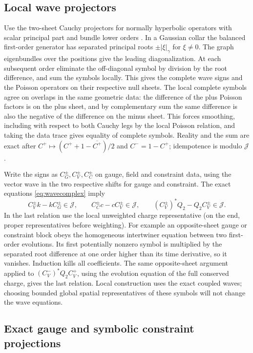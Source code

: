 \documentclass[11pt]{article}
\newcommand{\Reg}{\mathcal J}
\begin{document}
\subsection{Local wave projectors}

Use the two-sheet Cauchy projectors for normally hyperbolic operators with scalar principal part and bundle lower orders \cite[\S\S5--6]{GOW}. In a Gaussian collar the balanced first-order generator has separated principal roots \(\pm|\xi|_\gamma\) for \(\xi\ne0\). The graph eigenbundles over the positions give the leading diagonalization. At each subsequent order eliminate the off-diagonal symbol by division by the root difference, and sum the symbols locally. This gives the complete wave signs and the Poisson operators on their respective null sheets. The local complete symbols agree on overlaps in the same geometric data: the difference of the plus Poisson factors is on the plus sheet, and by complementary sum the same difference is also the negative of the difference on the minus sheet. This forces smoothing, including with respect to both Cauchy legs by the local Poisson relation, and taking the data trace gives equality of complete symbols. Reality and the sum are exact after \(C^+\mapsto(C^++1-\overline{C^+})/2\) and \(C^-=1-C^+\); idempotence is modulo \(\Reg\).

Write the signs as \(C_G^\pm,C_V^\pm,C_C^\pm\) on gauge, field and constraint data, using the vector wave in the two respective shifts for gauge and constraint. The exact equations \eqref{eq:wavecomplex} imply
\begin{equation}
 C_V^\pm k-k C_G^\pm\in\Reg,\qquad
 C_C^\pm c-c C_V^\pm\in\Reg,\qquad
 (C_V^\pm)^*Q_2-Q_2C_V^\pm\in\Reg .
 \label{eq:signs}
\end{equation}
In the last relation use the local unweighted charge representative (on the end, proper representatives before weighting). For example an opposite-sheet gauge or constraint block obeys the homogeneous intertwiner equation between two first-order evolutions. Its first potentially nonzero symbol is multiplied by the separated root difference at one order higher than its time derivative, so it vanishes. Induction kills all coefficients. The same opposite-sheet argument applied to \((C^-_V)^*Q_2C^+_V\), using the evolution equation of the full conserved charge, gives the last relation. Local construction uses the exact coupled waves; choosing bounded global spatial representatives of these symbols will not change the wave equations.

\subsection{Exact gauge and symbolic constraint projections}\label{sec:gauge}
\end{document}

